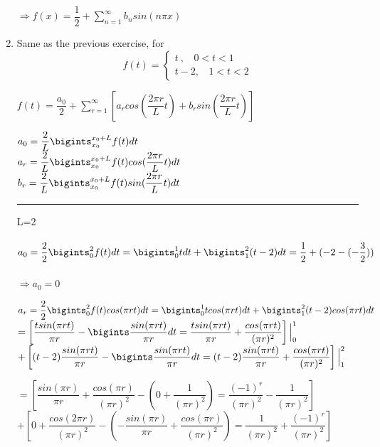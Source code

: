 \documentclass[fleqn]{article}
\begin{document}
\begin{enumerate}
      \textcolor{hwColor}{ 
        $
          \Longrightarrow f(x)=\dfrac{1}{2}+\sum\limits_{n=1}^{\infty}b_n sin(n\pi x)
        $
      }

    \item Same as the previous exercise, for 
    \begin{equation}
      f(t)=\begin{cases}
      t~, ~~~~0< t < 1 \\
      t-2, ~~~~1< t< 2 
      \end{cases}
    \end{equation}

      \textcolor{hwColor}{
        $f(t)=\dfrac{a_0}{2}+\sum\limits_{r=1}^{\infty}\left[a_r cos(\dfrac{2\pi r}{L}t)+b_r sin(\dfrac{2\pi r}{L}t)\right]$
      }

      \textcolor{hwColor}{
        $a_0=\dfrac{2}{L}\bigints_{x_0}^{x_0+L}f(t)dt$ \\
        $a_r=\dfrac{2}{L}\bigints_{x_0}^{x_0+L}f(t) cos(\dfrac{2\pi r}{L}t)dt$ \\
        $b_r=\dfrac{2}{L}\bigints_{x_0}^{x_0+L}f(t) sin(\dfrac{2\pi r}{L}t)dt$ \\
      }

      \textcolor{hwColor}{ 
        \rule{15cm}{0.4pt} 
      }

      \textcolor{hwColor}{ 
        L=2 \\
        \\
        $a_0=\dfrac{2}{2}\bigints_{0}^{2}f(t)dt=\bigints_{0}^{1}tdt+\bigints_{1}^{2}(t-2)dt=\dfrac{1}{2}+(-2-(-\dfrac{3}{2}))$ \\
        \\ 
        $\Longrightarrow a_0=0$
      }

      \bigbreak

      \textcolor{hwColor}{
        $a_r=\dfrac{2}{2}\bigints_{0}^{2}f(t) cos(\pi rt)dt=\bigints_{0}^{1}t cos(\pi rt)dt+\bigints_{1}^{2}(t-2) cos(\pi rt)dt$ \\
        $=\left[\dfrac{t sin(\pi rt)}{\pi r}-\bigints \dfrac{sin(\pi rt)}{\pi r}dt=\dfrac{t sin(\pi rt)}{\pi r}+\dfrac{cos(\pi rt)}{(\pi r)^2}\right]\Big|_{0}^{1}$ \\
        $+\left[(t-2)\dfrac{sin(\pi rt)}{\pi r}-\bigints \dfrac{sin(\pi rt)}{\pi r}dt=(t-2)\dfrac{sin(\pi rt)}{\pi r}+\dfrac{cos(\pi rt)}{(\pi r)^2}\right]\Big|_{1}^{2}$ \\
      }

      \bigbreak

      \textcolor{hwColor}{
        $=\left[\dfrac{sin(\pi r)}{\pi r}+\dfrac{cos(\pi r)}{(\pi r)^2}-(0+\dfrac{1}{(\pi r)^2})=\dfrac{(-1)^r}{(\pi r)^2}-\dfrac{1}{(\pi r)^2}\right]$ \\
        $+\left[0+\dfrac{cos(2\pi r)}{(\pi r)^2}-(-\dfrac{sin(\pi r)}{\pi r}+\dfrac{cos(\pi r)}{(\pi r)^2})=\dfrac{1}{(\pi r)^2}+\dfrac{(-1)^r}{(\pi r)^2}\right]$
      }


\end{enumerate}
\end{document}
